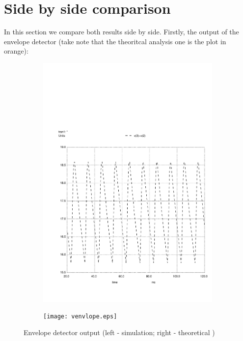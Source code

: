 \section{Side by side comparison}
\label{sec:comparison}

In this section we compare both results side by side. Firstly, the output of the envelope detector (take note that the theoritcal analysis one is the plot in orange):
\begin{figure}[h]
    \centering
    \begin{subfigure}{0.23\textwidth}
        \includegraphics[width=\linewidth, clip]{solution2.pdf}
        \label{fig:envd1}
    \end{subfigure}
    \begin{subfigure}{0.23\textwidth}
        \texttt{[image: venvlope.eps]}
        \label{fig:envd2}
    \end{subfigure}
    \caption{\small Envelope detector output (left - simulation; right - theoretical )}
    \label{env_detector}
\end{figure}

